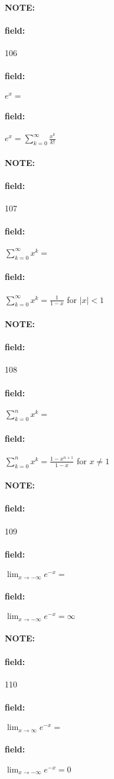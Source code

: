 \documentclass[12pt]{article}
\newenvironment{note}{\paragraph{NOTE:}}{}
\newenvironment{field}{\paragraph{field:}}{}
\begin{document}
\begin{note} \begin{field} \tiny 106 \end{field}
  \begin{field}
    $e^x = $
  \end{field}
  \begin{field}
    $e^x = \sum_{k=0}^\infty \frac{x^k}{k!}$
  \end{field}
\end{note}

\begin{note} \begin{field} \tiny 107 \end{field}
  \begin{field}
    $\sum_{k=0}^\infty x^k = $
  \end{field}
  \begin{field}
    $\sum_{k=0}^\infty x^k = \frac{1}{1-x}$ for $|x| < 1$
  \end{field}
\end{note}


\begin{note} \begin{field} \tiny 108 \end{field}
  \begin{field}
    $\sum_{k=0}^n x^k =$
  \end{field}
  \begin{field}
    $\sum_{k=0}^n x^k = \frac{1 - x^{n+1}}{1-x}$ for $x \neq 1$
  \end{field}
\end{note}

\begin{note} \begin{field} \tiny 109 \end{field}
  \begin{field}
    $\lim_{x \to -\infty} e^{-x} = $
  \end{field}
  \begin{field}
    $\lim_{x \to -\infty} e^{-x} = \infty$
  \end{field}
\end{note}

\begin{note} \begin{field} \tiny 110 \end{field}
  \begin{field}
    $\lim_{x \to \infty} e^{-x} = $
  \end{field}
  \begin{field}
    $\lim_{x \to -\infty} e^{-x} = 0$
  \end{field}
\end{note}
\end{document}
